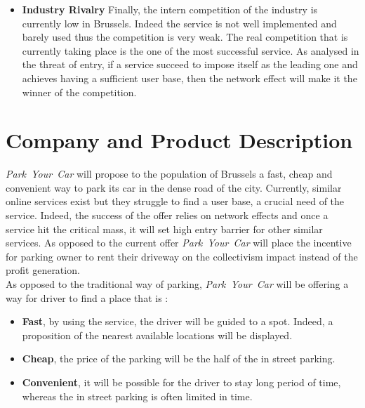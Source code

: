 \documentclass[12pt,a4paper,oneside]{book}
\newcommand{\bp}{\textit{Park~Your~Car }}
\begin{document}
\begin{itemize}
On the other hand, the motorist can choose to avoid to use his car as a transport mean. Indeed, public transportation, bicycle and walking are other possibilities. In that case, the user would have no use of a parking spot. Although this is a serious threat, the transportation by car stays a very popular choice.
\item \textbf{Industry Rivalry} Finally, the intern competition of the industry is currently low in Brussels. Indeed the service is not well implemented and barely used thus the competition is very weak. The real competition that is currently taking place is the one of the most successful service. As analysed in the threat of entry, if a service succeed to impose itself as the leading one and achieves  having a sufficient user base, then the network effect will make it the winner of the competition.
\end{itemize}

\chapter{Company and Product Description}

\bp will propose to the population of Brussels a fast, cheap and convenient way to park its car in the dense road of the city. Currently, similar online services exist but they struggle to find a user base, a crucial need of the service. Indeed, the success of the offer relies on network effects and once a service hit the critical mass, it will set high entry barrier for other similar services. As opposed to the current offer \bp will place the incentive for parking owner to rent their driveway on the collectivism impact instead of the profit generation.\\

As opposed to the traditional way of parking, \bp will be offering a way for driver to find a place that is :
\begin{itemize}
\item \textbf{Fast}, by using the service, the driver will be guided to a spot. Indeed, a proposition of the nearest available locations will be displayed.
\item \textbf{Cheap}, the price of the parking will be the half of the in street parking.
\item \textbf{Convenient}, it will be possible for the driver to stay long period of time, whereas the in street parking is often limited in time.
\end{itemize} 
\end{document}
